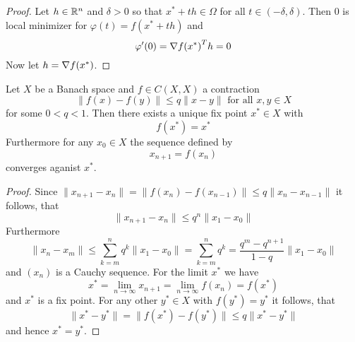 \begin{proof}
Let \( h \in \mathbb{R}^n \) and \( \delta > 0 \) so that \( x^* + th \in \Omega \) for all \( t \in (-\delta, \delta) \). 
Then \( 0 \) is local minimizer for \( \varphi(t) = f(x^* + th) \) and
\[
    \varphi^\prime(0) = {\nabla f(x^*)}^T h = 0
\]
Now let \( h = \nabla f(x^*) \). 
\end{proof}
\bigskip 


\begin{theorem}\label{thm:banach_fix_point}
Let \( X \) be a Banach space and \( f \in C(X,X) \) a contraction
\[
    \|f(x) - f(y)\| \le q \|x - y\| \text{ for all } x, y \in X
\]
for some \( 0 < q < 1 \). Then there exists a unique fix point \( x^* \in X \) with 
\[
     f(x^*) = x^*
\]
Furthermore for any \( x_0 \in X \) the sequence defined by
\[
     x_{n+1} = f(x_n)
\]
converges aganist \( x^* \).
\end{theorem}

\begin{proof}
Since \( \| x_{n+1} - x_n\| =\| f(x_n) - f(x_{n-1})\| \le q\| x_n - x_{n-1}\| \) it follows, that
\[ 
    \| x_{n+1} - x_n\| \le q^n  \|x_1 - x_0\| 
\] 
Furthermore
\[ 
    \| x_n - x_m\| \le \sum_{k=m}^n q^k \|x_1 - x_0\| = \sum_{k=m}^n q^k = \frac{q^m - q^{n+1}}{1 - q} \|x_1 - x_0\| 
\] 
and \( (x_n) \) is a Cauchy sequence. For the limit \( x^* \) we have
\[ 
   x^* = \lim_{n\to\infty} x_{n+1} = \lim_{n\to\infty} f(x_n) = f(x^*)
\] 
and \( x^* \) is a fix point. For any other \( y^* \in X \) with \( f(y^*) = y^* \) it follows, that
\[
    \|x^* - y^*\| = \|f(x^*) - f(y^*)\| \le q \|x^* - y^*\|
\]
and hence \( x^* = y^*\).

\end{proof}
\bigskip

